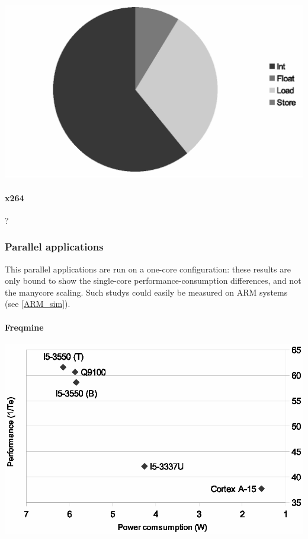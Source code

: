 \documentclass{article}
\newenvironment{Figure}
  {\par\medskip\noindent\center\minipage{0.9\linewidth}}
  {\endminipage\par\bigskip\medskip}
\begin{document}
\begin{multicols}{2}
\begin{Figure}
\centering
\includegraphics[width=\linewidth]{IS_instr.eps}
\end{Figure}


\paragraph{x264\\}
?


\subsubsection{Parallel applications}
This parallel applications are run on a one-core configuration: these results are only bound to show the single-core performance-consumption differences, and not the manycore scaling. Such studys could easily be measured on ARM systems (see \ref{ARM_sim}).

\paragraph{Freqmine\\}

\begin{Figure}
\centering
\includegraphics[width=\linewidth]{Freqmine.eps}
\end{Figure}


\end{multicols}
\end{document}
